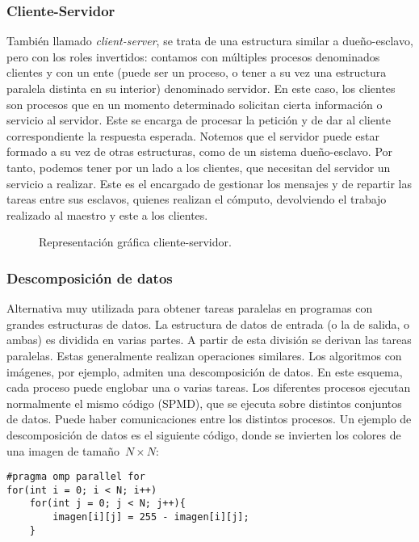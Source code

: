 \subsubsection{Cliente-Servidor} 
También llamado \emph{client-server}, se trata de una estructura similar a dueño-esclavo, pero con los roles invertidos: contamos con múltiples procesos denominados clientes y con un ente (puede ser un proceso, o tener a su vez una estructura paralela distinta en su interior) denominado servidor. En este caso, los clientes son procesos que en un momento determinado solicitan cierta información o servicio al servidor. Este se encarga de procesar la petición y de dar al cliente correspondiente la respuesta esperada. 
Notemos que el servidor puede estar formado a su vez de otras estructuras, como de un sistema dueño-esclavo. Por tanto, podemos tener por un lado a los clientes, que necesitan del servidor un servicio a realizar. Este es el encargado de gestionar los mensajes y de repartir las tareas entre sus esclavos, quienes realizan el cómputo, devolviendo el trabajo realizado al maestro y este a los clientes. 
\begin{figure}[H]
\centering
{}
\caption{Representación gráfica cliente-servidor.}
\label{graph:cliente_servidor}
\end{figure}

\subsubsection{Descomposición de datos} 
Alternativa muy utilizada para obtener tareas paralelas en programas con grandes estructuras de datos. La estructura de datos de entrada (o la de salida, o ambas) es dividida en varias partes. A partir de esta división se derivan las tareas paralelas. Estas generalmente realizan operaciones similares. Los algoritmos con imágenes, por ejemplo, admiten una descomposición de datos.
En este esquema, cada proceso puede englobar una o varias tareas. Los diferentes procesos ejecutan normalmente el mismo código (SPMD), que se ejecuta sobre distintos conjuntos de datos. Puede haber comunicaciones entre los distintos procesos.
Un ejemplo de descomposición de datos es el siguiente código, donde se invierten los colores de una imagen de tamaño~$N\times N$:
    \begin{verbatim}
#pragma omp parallel for
for(int i = 0; i < N; i++)
    for(int j = 0; j < N; j++){
        imagen[i][j] = 255 - imagen[i][j];
    }
    \end{verbatim}

